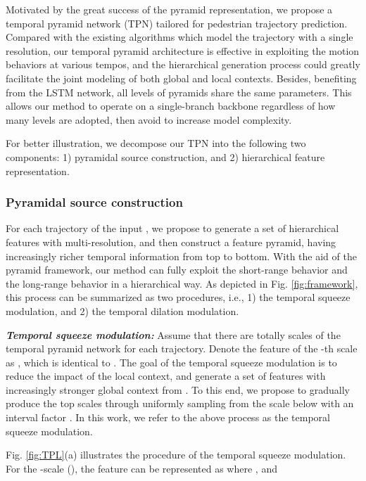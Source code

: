 \documentclass[letterpaper]{article} \usepackage{aaai21}  \usepackage{times}  \usepackage{helvet} \usepackage{courier}  \usepackage[hyphens]{url}  \usepackage{graphicx} \urlstyle{rm} \def\UrlFont{\rm}  \usepackage{natbib}  \usepackage{caption} \frenchspacing  \setlength{\pdfpagewidth}{8.5in}  \setlength{\pdfpageheight}{11in}
\begin{document}
Motivated by the great success of the pyramid representation, we propose a temporal pyramid network (TPN) tailored for pedestrian trajectory prediction. Compared with the existing algorithms which model the trajectory with a single resolution, 
our temporal pyramid architecture is effective in exploiting the motion behaviors at various tempos, and the hierarchical generation process could greatly facilitate the joint modeling of both global and local contexts. Besides, benefiting from the LSTM network, all levels of pyramids share the same parameters. This allows our method to operate on a single-branch backbone regardless of how many levels are adopted, then avoid to increase model complexity. 


For better illustration, we decompose our TPN into the following two components: 1) pyramidal source construction, and 2) hierarchical feature representation. 



\subsubsection{Pyramidal source construction} \label{sec:psc}
For each trajectory of the input , we propose to generate a set of  hierarchical features with multi-resolution, and then construct a feature pyramid, having increasingly richer temporal information from top to bottom. With the aid of the pyramid framework, our method can fully exploit the short-range behavior and the long-range behavior in a hierarchical way.  As depicted in Fig. \ref{fig:framework}, this process can be summarized as two procedures, i.e., 1) the temporal squeeze modulation, and 2) the temporal dilation modulation.

\noindent\textit{\textbf{Temporal squeeze modulation:}}
Assume that there are totally  scales of the temporal pyramid network for each trajectory. Denote the feature of the -th scale as , which is identical to . The goal of the temporal squeeze modulation is to reduce the impact of the local context, and generate a set of features with increasingly stronger global context from . 
To this end, we propose to gradually produce the top  scales through uniformly sampling from the scale below with an interval factor .   
In this work, we refer to the above process as the temporal squeeze modulation. 

Fig. \ref{fig:TPL}(a) illustrates the procedure of the temporal squeeze modulation. For the -scale (), the feature can be represented as 
 where , and
\end{document}
